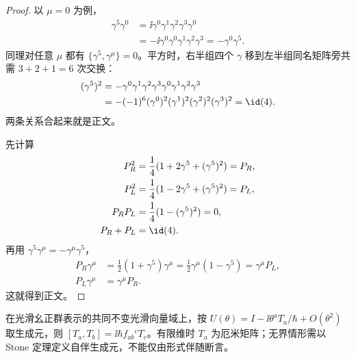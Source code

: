 \begin{proof}
以 $\mu=0$ 为例，
\begin{align*}
 \gamma^5\gamma^0
 &=\ii\gamma^0\gamma^1\gamma^2\gamma^3\gamma^0\\
 &=-\ii\gamma^0\gamma^0\gamma^1\gamma^2\gamma^3
 =-\gamma^0\gamma^5.
\end{align*}
同理对任意 $\mu$ 都有 $\{\gamma^5,\gamma^\mu\}=0$。平方时，右半组四个 $\gamma$ 移到左半组同名矩阵旁共需 $3+2+1=6$ 次交换：
\begin{align*}
 (\gamma^5)^2
 &=-\gamma^0\gamma^1\gamma^2\gamma^3
 \gamma^0\gamma^1\gamma^2\gamma^3\\
 &=-(-1)^6(\gamma^0)^2(\gamma^1)^2(\gamma^2)^2(\gamma^3)^2
 =\id(4).
\end{align*}
两条关系合起来就是正文。

先计算
\begin{align*}
 P_R^2&=\frac14(1+2\gamma^5+(\gamma^5)^2)=P_R,\\
 P_L^2&=\frac14(1-2\gamma^5+(\gamma^5)^2)=P_L,\\
 P_RP_L&=\frac14(1-(\gamma^5)^2)=0,\\
 P_R+P_L&=\id(4).
\end{align*}
再用 $\gamma^5\gamma^\mu=-\gamma^\mu\gamma^5$，
\begin{align*}
 P_R\gamma^\mu
 &=\frac12(1+\gamma^5)\gamma^\mu
 =\frac12\gamma^\mu(1-\gamma^5)
 =\gamma^\mu P_L,\\
 P_L\gamma^\mu&=\gamma^\mu P_R.
\end{align*}
这就得到正文。
\end{proof}

\begin{proposition}[幺正表示的厄米生成元闭合]
在光滑幺正群表示的共同不变光滑向量域上，按 $U(\theta)=I-\ii\theta^aT_a/\hbar+O(\theta^2)$ 取生成元，则 $[T_a,T_b]=\ii\hbar f_{ab}{}^cT_c$。有限维时 $T_a$ 为厄米矩阵；无界情形需以 Stone 定理定义自伴生成元，不能仅由形式伴随断言。
\end{proposition}

